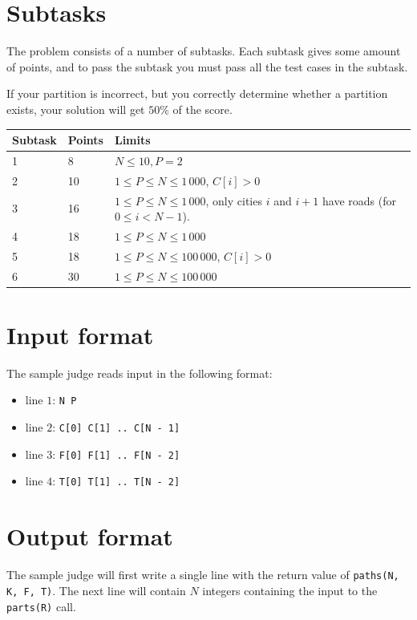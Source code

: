 \section*{Subtasks}
The problem consists of a number of subtasks. Each subtask gives some amount of points, and to pass
the subtask you must pass all the test cases in the subtask.

If your partition is incorrect, but you correctly determine whether a partition exists, your solution
will get $50\%$ of the score. 
\begin{tabular}{|l|l|l|}
  \hline
  \textbf{Subtask} & \textbf{Points} & \textbf{Limits} \\ \hline
  1 & 8 & $N \le 10, P = 2$ \\ \hline
	2 & 10 & $1 \le P \le N \le 1\,000$, $C[i] > 0$ \\ \hline
	3 & 16 & $1 \le P \le N \le 1\,000$, only cities $i$ and $i + 1$ have roads (for $0 \le i < N - 1$). \\ \hline
  4 & 18 & $1 \le P \le N \le 1\,000$ \\ \hline
	5 & 18 & $1 \le P \le N \le 100\,000$, $C[i] > 0$ \\ \hline
  6 & 30 & $1 \le P \le N \le 100\,000$ \\ \hline
\end{tabular}

\section*{Input format}
The sample judge reads input in the following format:

\begin{itemize}
  \item line $1$: \texttt{N P}
  \item line $2$: \texttt{C[0] C[1] .. C[N - 1]}
  \item line $3$: \texttt{F[0] F[1] .. F[N - 2]}
  \item line $4$: \texttt{T[0] T[1] .. T[N - 2]}
\end{itemize}

\section*{Output format}
The sample judge will first write a single line with the return value of \texttt{paths(N, K, F, T)}. The next line will contain $N$ integers containing the input to the \texttt{parts(R)} call.
